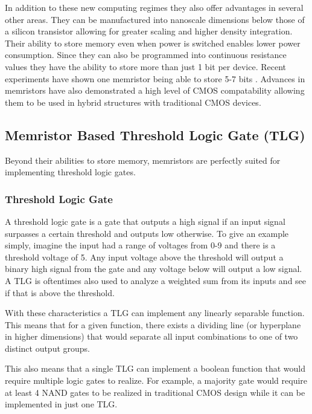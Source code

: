 \documentclass[sigconf]{acmart}
\begin{document}
In addition to these new computing regimes they also offer advantages 
in several other areas. They can be manufactured into nanoscale 
dimensions below those of a silicon transistor allowing for greater scaling 
and higher density integration. Their ability to store memory even 
when power is switched enables lower power consumption. Since they can 
also be programmed into continuous resistance values they have the 
ability to store more than just 1 bit per device. Recent experiments
have shown one memristor being able to store 5-7 bits \cite{papandroulidakis2019practical}. Advances 
in memristors have also demonstrated a high level of CMOS compatability 
allowing them to be used in hybrid structures with traditional CMOS 
devices. 

\subsection{Memristor Based Threshold Logic Gate (TLG)}
Beyond their abilities to store memory, memristors are perfectly suited 
for implementing threshold logic gates. 

\subsubsection{Threshold Logic Gate}
A threshold logic gate is a gate that outputs a high signal if 
an input signal surpasses a certain threshold and outputs low 
otherwise. To give an example simply, imagine the input had a range 
of voltages from 0-9 and there is a threshold voltage of 5. Any
input voltage above the threshold will output a binary high signal from the 
gate and any voltage below will output a low signal. A TLG 
is oftentimes also used to analyze a weighted sum from its inputs 
and see if that is above the threshold. 

With these characteristics a TLG can implement any linearly separable
function. This means that for a given function, there exists a 
dividing line (or hyperplane in higher dimensions) that would 
separate all input combinations to one of two distinct output 
groups. 

This also means that a single TLG can implement a boolean function 
that would require multiple logic gates to realize. For example, a 
majority gate would require at least 4 NAND gates to be realized in 
traditional CMOS design while it can be implemented in just one TLG. 
\end{document}
